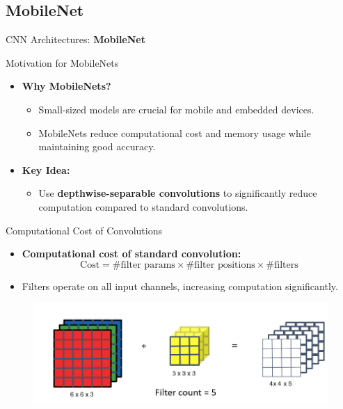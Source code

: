 \subsection{MobileNet}
\begin{frame}{}
    \LARGE CNN Architectures: \textbf{MobileNet}
\end{frame}

\begin{frame}{Motivation for MobileNets}
    \begin{itemize}
        \item \textbf{Why MobileNets?}
        \begin{itemize}
            \item Small-sized models are crucial for mobile and embedded devices.
            \item MobileNets reduce computational cost and memory usage while maintaining good accuracy.
        \end{itemize}
        \item \textbf{Key Idea:}
        \begin{itemize}
            \item Use \textbf{depthwise-separable convolutions} to significantly reduce computation compared to standard convolutions.
        \end{itemize}
    \end{itemize}
\end{frame}

\begin{frame}{Computational Cost of Convolutions}
    \begin{itemize}
        \item \textbf{Computational cost of standard convolution:}
        \[
        \text{Cost} = \text{\# filter params} \times \text{\# filter positions} \times \text{\# filters}
        \]
        \item Filters operate on all input channels, increasing computation significantly.
    \end{itemize}
    \begin{figure}
        \centering
        \includegraphics[width=0.8\linewidth]{images/cnn/NormalConv_MobileNet.png} 
    \end{figure}
\end{frame}

